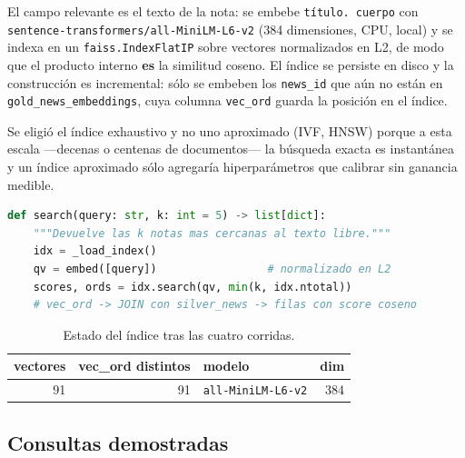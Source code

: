 \documentclass[11pt,a4paper]{article}
\begin{document}
El campo relevante es el texto de la nota: se embebe \texttt{título. cuerpo} con
\texttt{sentence-transformers/all-MiniLM-L6-v2} (384 dimensiones, CPU, local) y
se indexa en un \texttt{faiss.IndexFlatIP} sobre vectores normalizados en L2, de
modo que el producto interno \textbf{es} la similitud coseno. El índice se
persiste en disco y la construcción es incremental: sólo se embeben los
\texttt{news\_id} que aún no están en \texttt{gold\_news\_embeddings}, cuya
columna \texttt{vec\_ord} guarda la posición en el índice.

Se eligió el índice exhaustivo y no uno aproximado (IVF, HNSW) porque a esta
escala ---decenas o centenas de documentos--- la búsqueda exacta es instantánea
y un índice aproximado sólo agregaría hiperparámetros que calibrar sin ganancia
medible.

\begin{lstlisting}[language=Python, caption={Función de búsqueda semántica expuesta (\texttt{gold.py}).}]
def search(query: str, k: int = 5) -> list[dict]:
    """Devuelve las k notas mas cercanas al texto libre."""
    idx = _load_index()
    qv = embed([query])                 # normalizado en L2
    scores, ords = idx.search(qv, min(k, idx.ntotal))
    # vec_ord -> JOIN con silver_news -> filas con score coseno
\end{lstlisting}

\begin{table}[h]
\centering\small
\caption{Estado del índice tras las cuatro corridas.}
\begin{tabular}{@{}rrlr@{}}
\toprule
\textbf{vectores} & \textbf{vec\_ord distintos} & \textbf{modelo} & \textbf{dim} \\
\midrule
91 & 91 & \texttt{all-MiniLM-L6-v2} & 384 \\
\bottomrule
\end{tabular}
\end{table}

\subsection*{Consultas demostradas}
\end{document}
